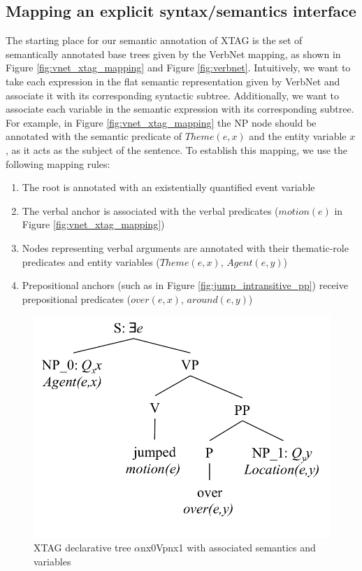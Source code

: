 \documentclass[11pt,a4paper]{article}
\begin{document}
\subsection{Mapping an explicit syntax/semantics interface}

The starting place for our semantic annotation of XTAG is the set of semantically annotated base trees given by the VerbNet mapping, as shown in Figure \ref{fig:vnet_xtag_mapping} and Figure \ref{fig:verbnet}. Intuitively, we want to take each expression in the flat semantic representation given by VerbNet and associate it with its corresponding syntactic subtree. Additionally, we want to associate each variable in the semantic expression with its corresponding subtree. For example, in Figure \ref{fig:vnet_xtag_mapping} the NP node should be annotated with the semantic predicate of $Theme(e, x)$ and the entity variable $x$, as it acts as the subject of the sentence. To establish this mapping, we use the following mapping rules: 

\begin{enumerate}

\item The root is annotated with an existentially quantified event variable 
\item The verbal anchor is associated with the verbal predicates ($motion(e)$ in Figure \ref{fig:vnet_xtag_mapping})
\item Nodes representing verbal arguments are annotated with their thematic-role predicates and entity variables ($Theme(e,x)$, $Agent(e, y)$)
\item Prepositional anchors (such as in Figure \ref{fig:jump_intransitive_pp}) receive prepositional predicates ($over(e,x)$, $around(e,y)$)
\end{enumerate}

\begin{figure}[h]
\begin{centering}
    \includegraphics[width=.6 \linewidth ]{resources/ch5_resources/jump_declarative_semantics.pdf}
    \caption{XTAG declarative tree $\alpha$nx0Vpnx1 with associated semantics and variables}
    \label{fig:jump_declarative_semantics}
\end{centering}
\end{figure}
\end{document}
